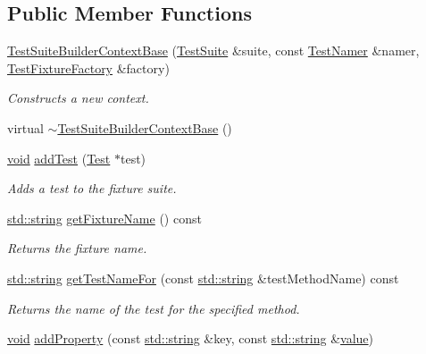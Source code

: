 \subsection*{Public Member Functions}
\begin{DoxyCompactItemize}
\item 
\hyperlink{class_test_suite_builder_context_base_a434b04354f7e326c7f88d015921d5e6d}{Test\-Suite\-Builder\-Context\-Base} (\hyperlink{class_test_suite}{Test\-Suite} \&suite, const \hyperlink{class_test_namer}{Test\-Namer} \&namer, \hyperlink{class_test_fixture_factory}{Test\-Fixture\-Factory} \&factory)
\begin{DoxyCompactList}\small\item\em Constructs a new context. \end{DoxyCompactList}\item 
virtual \hyperlink{class_test_suite_builder_context_base_a25868530a384995987e2260fda4adae0}{$\sim$\-Test\-Suite\-Builder\-Context\-Base} ()
\item 
\hyperlink{wglew_8h_aeea6e3dfae3acf232096f57d2d57f084}{void} \hyperlink{class_test_suite_builder_context_base_a8b42185139e3efe07a0fe69b9549e928}{add\-Test} (\hyperlink{class_test}{Test} $\ast$test)
\begin{DoxyCompactList}\small\item\em Adds a test to the fixture suite. \end{DoxyCompactList}\item 
\hyperlink{glew_8h_ae84541b4f3d8e1ea24ec0f466a8c568b}{std\-::string} \hyperlink{class_test_suite_builder_context_base_abba530361ccd63ddf23fcbdc4f33727f}{get\-Fixture\-Name} () const 
\begin{DoxyCompactList}\small\item\em Returns the fixture name. \end{DoxyCompactList}\item 
\hyperlink{glew_8h_ae84541b4f3d8e1ea24ec0f466a8c568b}{std\-::string} \hyperlink{class_test_suite_builder_context_base_a137a255602edbdc2e1dc575fb53fee9e}{get\-Test\-Name\-For} (const \hyperlink{glew_8h_ae84541b4f3d8e1ea24ec0f466a8c568b}{std\-::string} \&test\-Method\-Name) const 
\begin{DoxyCompactList}\small\item\em Returns the name of the test for the specified method. \end{DoxyCompactList}\item 
\hyperlink{wglew_8h_aeea6e3dfae3acf232096f57d2d57f084}{void} \hyperlink{class_test_suite_builder_context_base_a358c75376f4d3df2ef570003cbe2e06a}{add\-Property} (const \hyperlink{glew_8h_ae84541b4f3d8e1ea24ec0f466a8c568b}{std\-::string} \&key, const \hyperlink{glew_8h_ae84541b4f3d8e1ea24ec0f466a8c568b}{std\-::string} \&\hyperlink{fmod__dsp_8h_a6a4f8a1a444e9080b297963b3db29fe0}{value})

\end{DoxyCompactItemize}
